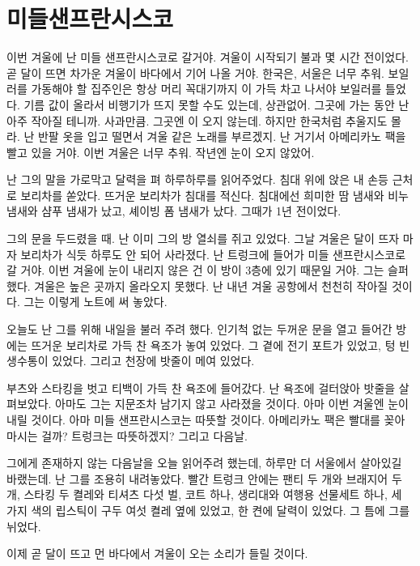 \documentclass[12pt, b6paper, openany]{memoir}
\newenvironment{article}{}{}
\begin{document}
\begin{article}
\hypertarget{uxbbf8uxb4e4uxc0ccuxd504uxb780uxc2dcuxc2a4uxcf54}{%
\chapter{미들샌프란시스코}\label{uxbbf8uxb4e4uxc0ccuxd504uxb780uxc2dcuxc2a4uxcf54}}

이번 겨울에 난 미들 샌프란시스코로 갈거야. 겨울이 시작되기 불과 몇 시간 전이었다. 곧 달이 뜨면 차가운 겨울이 바다에서 기어 나올 거야. 한국은, 서울은 너무 추워. 보일러를 가동해야 할 집주인은 항상 머리 꼭대기까지 이 가득 차고 나서야 보일러를 틀었다. 기름 값이 올라서 비행기가 뜨지 못할 수도 있는데, 상관없어. 그곳에 가는 동안 난 아주 작아질 테니까. 사과만큼. 그곳엔 이 오지 않는데. 하지만 한국처럼 추울지도 몰라. 난 반팔 옷을 입고 떨면서 겨울 같은 노래를 부르겠지. 난 거기서 아메리카노 팩을 빨고 있을 거야. 이번 겨울은 너무 추워. 작년엔 눈이 오지 않았어.

난 그의 말을 가로막고 달력을 펴 하루하루를 읽어주었다. 침대 위에 앉은 내 손등 근처로 보리차를 쏟았다. 뜨거운 보리차가 침대를 적신다. 침대에선 희미한 땀 냄새와 비누 냄새와 샴푸 냄새가 났고, 셰이빙 폼 냄새가 났다. 그때가 1년 전이었다.

그의 문을 두드렸을 때. 난 이미 그의 방 열쇠를 쥐고 있었다. 그날 겨울은 달이 뜨자 마자 보리차가 식듯 하루도 안 되어 사라졌다. 난 트렁크에 들어가 미들 샌프란시스코로 갈 거야. 이번 겨울에 눈이 내리지 않은 건 이 방이 3층에 있기 때문일 거야. 그는 슬퍼했다. 겨울은 높은 곳까지 올라오지 못했다. 난 내년 겨울 공항에서 천천히 작아질 것이다. 그는 이렇게 노트에 써 놓았다.

오늘도 난 그를 위해 내일을 불러 주려 했다. 인기척 없는 두꺼운 문을 열고 들어간 방에는 뜨거운 보리차로 가득 찬 욕조가 놓여 있었다. 그 곁에 전기 포트가 있었고, 텅 빈 생수통이 있었다. 그리고 천장에 밧줄이 메여 있었다.

부츠와 스타킹을 벗고 티백이 가득 찬 욕조에 들어갔다. 난 욕조에 걸터앉아 밧줄을 살펴보았다. 아마도 그는 지문조차 남기지 않고 사라졌을 것이다. 아마 이번 겨울엔 눈이 내릴 것이다. 아마 미들 샌프란시스코는 따뜻할 것이다. 아메리카노 팩은 빨대를 꽂아 마시는 걸까? 트렁크는 따뜻하겠지? 그리고 다음날.

그에게 존재하지 않는 다음날을 오늘 읽어주려 했는데, 하루만 더 서울에서 살아있길 바랬는데. 난 그를 조용히 내려놓았다. 빨간 트렁크 안에는 팬티 두 개와 브래지어 두 개, 스타킹 두 켤레와 티셔츠 다섯 벌, 코트 하나, 생리대와 여행용 선물세트 하나, 세 가지 색의 립스틱이 구두 여섯 켤레 옆에 있었고, 한 켠에 달력이 있었다. 그 틈에 그를 뉘었다.

이제 곧 달이 뜨고 먼 바다에서 겨울이 오는 소리가 들릴 것이다.
\end{article}
\end{document}
